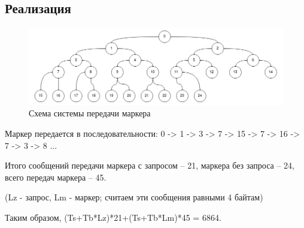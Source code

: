 \documentclass[a4paper,12pt,titlepage,final]{article}
\begin{document}
\subsection{Реализация}
\begin{figure}[h!]
  \includegraphics[width=1\linewidth]{marker.png}
  \caption{Схема системы передачи маркера}
  \label{fig:marker}
\end{figure}
Маркер передается в последовательности: 0 -> 1 -> 3 -> 7 -> 15 -> 7 -> 16 -> 7 -> 3 -> 8 ...\par
Итого сообщений передачи маркера с запросом – 21, маркера без запроса – 24, всего передач маркера – 45.\par
(Lz - запрос, Lm - маркер; считаем эти сообщения равными 4 байтам)\par
Таким образом, (Ts+Tb*Lz)*21+(Ts+Tb*Lm)*45 = 6864.
\end{document}

